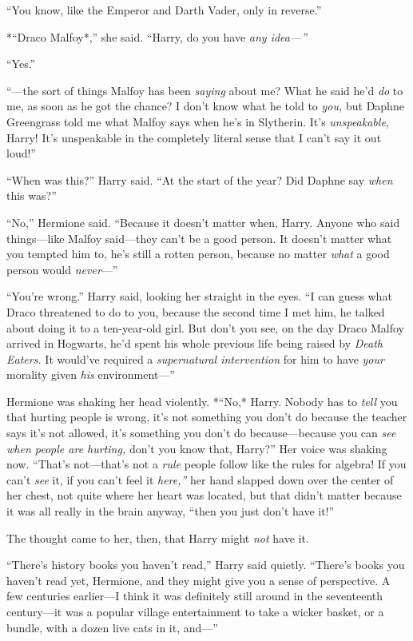 ``You know, like the Emperor and Darth Vader, only in reverse.''

*``Draco Malfoy*,'' she said. ``Harry, do you have \emph{any idea---''}

``Yes.''

``---the sort of things Malfoy has been \emph{saying} about me? What he
said he'd \emph{do} to me, as soon as he got the chance? I don't know
what he told to \emph{you,} but Daphne Greengrass told me what Malfoy
says when he's in Slytherin. It's \emph{unspeakable,} Harry! It's
unspeakable in the completely literal sense that I can't say it out
loud!''

``When was this?'' Harry said. ``At the start of the year? Did Daphne
say \emph{when} this was?''

``No,'' Hermione said. ``Because it doesn't matter when, Harry. Anyone
who said things---like Malfoy said---they can't be a good person. It
doesn't matter what you tempted him to, he's still a rotten person,
because no matter \emph{what} a good person would \emph{never}---''

``You're wrong.'' Harry said, looking her straight in the eyes. ``I can
guess what Draco threatened to do to you, because the second time I met
him, he talked about doing it to a ten-year-old girl. But don't you see,
on the day Draco Malfoy arrived in Hogwarts, he'd spent his whole
previous life being raised by \emph{Death Eaters.} It would've required
a \emph{supernatural intervention} for him to have \emph{your} morality
given \emph{his} environment---''

Hermione was shaking her head violently. *``No,* Harry. Nobody has to
\emph{tell} you that hurting people is wrong, it's not something you
don't do because the teacher says it's not allowed, it's something you
don't do because---because you can \emph{see when people are hurting,}
don't you know that, Harry?'' Her voice was shaking now. ``That's
not---that's not a \emph{rule} people follow like the rules for algebra!
If you can't \emph{see} it, if you can't feel it \emph{here,''} her hand
slapped down over the center of her chest, not quite where her heart was
located, but that didn't matter because it was all really in the brain
anyway, ``then you just don't have it!''

The thought came to her, then, that Harry might \emph{not} have it.

``There's history books you haven't read,'' Harry said quietly.
``There's books you haven't read yet, Hermione, and they might give you
a sense of perspective. A few centuries earlier---I think it was
definitely still around in the seventeenth century---it was a popular
village entertainment to take a wicker basket, or a bundle, with a dozen
live cats in it, and---''

